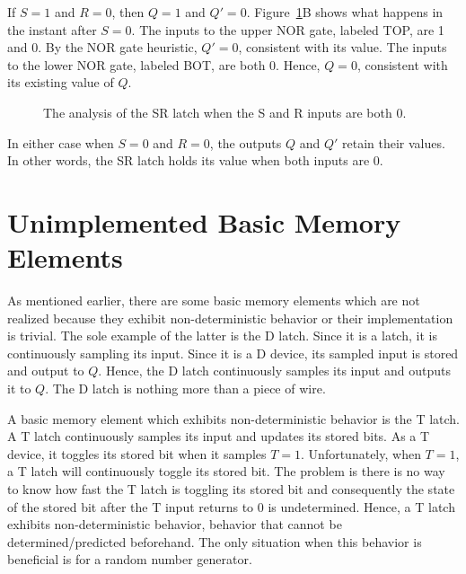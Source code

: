 If $S=1$ and $R=0$, then $Q=1$ and $Q'=0$.  Figure~\ref{fig:SRL1}B
shows what happens in the instant after $S=0$.  The inputs to 
the upper NOR gate, labeled TOP, are 1 and 0.  By the NOR
gate heuristic, $Q'=0$, consistent with its value.  The 
inputs to the lower NOR gate, labeled BOT, are both 0. Hence, 
$Q=0$, consistent with its existing value of $Q$.  

\begin{figure}[ht]
\caption{The analysis of the SR latch when the S and R
inputs are both 0.}
\label{fig:SRL1}
\end{figure}

In either case when $S=0$ and $R=0$, the outputs $Q$ and $Q'$ retain 
their values.  In other words, the SR latch holds its value when 
both inputs are 0. 

\section{Unimplemented Basic Memory Elements}
As mentioned earlier, there are some basic memory elements 
which are not realized because they exhibit non-deterministic 
behavior or their implementation is trivial.  The sole example
of the latter is the D latch.  
Since it is a latch, it is continuously sampling its input.  Since it is a 
D device, its sampled input is stored and output to $Q$. Hence, the 
D latch continuously samples its input and outputs it to $Q$.
The D latch is nothing more than a piece of wire.

A basic memory element which exhibits non-deterministic behavior
is the  T latch.   A T latch continuously samples
its input and updates its stored bits.  As a T device, it toggles
its stored bit when it samples $T=1$.  Unfortunately, when $T=1$,
a T latch will continuously toggle its stored bit. The problem is 
there is no way to know how fast the T latch is toggling its stored 
bit and consequently the state of the stored bit after the T input 
returns to 0 is undetermined.  Hence, a T latch exhibits 
non-deterministic behavior, behavior that cannot be 
determined/predicted beforehand.  The only situation when this 
behavior is beneficial is for a random number generator.  

